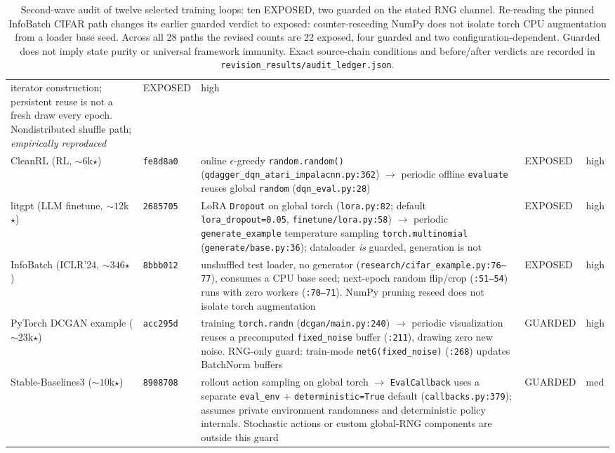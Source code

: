 \documentclass[10pt,letterpaper]{article}
\theoremstyle{remark}
\newcommand{\code}[1]{\texttt{#1}}
\begin{document}
\begin{table}[tbp]
\begin{tabular}{@{}L{2.15cm}L{1.0cm}L{6.4cm}L{1.15cm}L{1.0cm}@{}}
iterator construction; persistent reuse is not a fresh draw every epoch.
Nondistributed shuffle path; \emph{empirically reproduced} & EXPOSED & high \\
\addlinespace
CleanRL (RL, ${\sim}6$k$\star$) & \code{fe8d8a0} &
online $\epsilon$-greedy \code{random.random()} (\code{qdagger\_dqn\_}\allowbreak\code{atari\_impalacnn.py:362})
$\to$ periodic offline \code{evaluate} reuses global \code{random}
(\code{dqn\_eval.py:28}) & EXPOSED & high \\
\addlinespace
litgpt (LLM finetune, ${\sim}12$k$\star$) & \code{2685705} &
LoRA \code{Dropout} on global torch (\code{lora.py:82}; default
\code{lora\_dropout=0.05}, \code{finetune/lora.py:58}) $\to$
periodic \code{generate\_example} temperature sampling
\code{torch.multinomial} (\code{generate/base.py:36}); dataloader \emph{is}
guarded, generation is not & EXPOSED & high \\
\addlinespace
InfoBatch (ICLR'24, ${\sim}346$$\star$) & \code{8bbb012} &
unshuffled test loader, no generator
(\code{research/cifar\_example.py:76--77}), consumes a CPU base seed;
next-epoch random flip/crop (\code{:51--54}) runs with zero workers
(\code{:70--71}). NumPy pruning reseed does not isolate torch augmentation
& EXPOSED & high \\
\addlinespace
PyTorch DCGAN example (${\sim}23$k$\star$) & \code{acc295d} &
training \code{torch.randn} (\code{dcgan/main.py:240}) $\to$ periodic
visualization reuses a precomputed \code{fixed\_noise} buffer
(\code{:211}), drawing zero new noise. RNG-only guard: train-mode
\code{netG(fixed\_noise)} (\code{:268}) updates BatchNorm buffers & GUARDED & high \\
\addlinespace
Stable-Baselines3 (${\sim}10$k$\star$) & \code{8908708} &
rollout action sampling on global torch $\to$ \code{EvalCallback}
uses a separate \code{eval\_env} + \code{deterministic=True} default
(\code{callbacks.py:379}); assumes private environment randomness and
deterministic policy internals. Stochastic actions or custom global-RNG
components are outside this guard &
GUARDED & med \\
\bottomrule
\end{tabular}
\caption{Second-wave audit of twelve selected training loops: ten EXPOSED,
two guarded on the stated RNG channel. Re-reading the pinned InfoBatch
CIFAR path changes its earlier guarded verdict to exposed: counter-reseeding
NumPy does not isolate torch CPU augmentation from a loader base seed.
Across all 28 paths the revised counts are 22 exposed, four guarded and
two configuration-dependent. Guarded does not imply state purity or
universal framework immunity. Exact source-chain conditions and before/after
verdicts are recorded in \code{revision\_results/audit\_ledger.json}.}
\label{tab:fieldwide}
\end{table}
\end{document}
